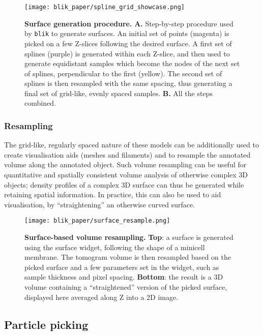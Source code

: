 \begin{figure}[!ht]
    \centering
    \texttt{[image: blik\_paper/spline\_grid\_showcase.png]}
    \caption[Surface generation procedure]{\textbf{Surface generation procedure.} \textbf{A.} Step-by-step procedure used by \texttt{blik} to generate surfaces. An initial set of points (magenta) is picked on a few Z-slices following the desired surface. A first set of splines (purple) is generated within each Z-slice, and then used to generate equidistant samples which become the nodes of the next set of splines, perpendicular to the first (yellow). The second set of splines is then resampled with the same spacing, thus generating a final set of grid-like, evenly spaced samples. \textbf{B.} All the steps combined.}
    \label{surface-pick}
\end{figure}

\subsubsection{Resampling}\label{resampling}
The grid-like, regularly spaced nature of these models can be additionally used to create visualisation aids (meshes and filaments) and to resample the annotated volume along the annotated object. Such volume resampling can be useful for quantitative and spatially consistent volume analysis of otherwise complex 3D objects; density profiles of a complex 3D surface can thus be generated while retaining spatial information. In practice, this can also be used to aid visualisation, by ``straightening'' an otherwise curved surface.

\begin{figure}[!ht]
    \centering
    \texttt{[image: blik\_paper/surface\_resample.png]}
    \caption[Surface-based volume resampling]{\textbf{Surface-based volume resampling.} \textbf{Top}: a surface is generated using the surface widget, following the shape of a minicell membrane. The tomogram volume is then resampled based on the picked surface and a few parameters set in the widget, such as sample thickness and pixel spacing. \textbf{Bottom}: the result is a 3D volume containing a ``straightened'' version of the picked surface, displayed here averaged along Z into a 2D image.}
    \label{surface-resample}
\end{figure}

\subsection{Particle picking}\label{particle-picking}

